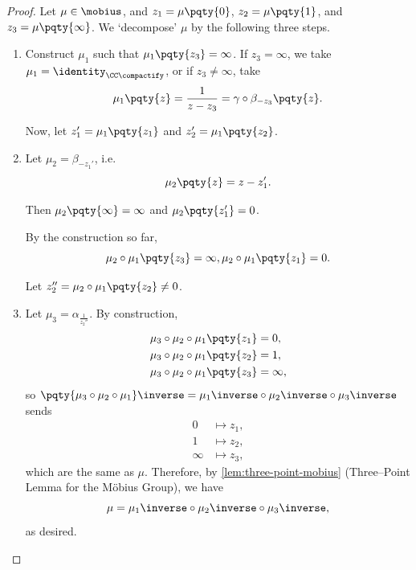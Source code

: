 \begin{proof}
    Let \(\mu \in \mobius\), and \(z_1 = \mu\pqty{0}\), \(z_2 = \mu\pqty{1}\), and \(z_3 = \mu\pqty{\infty}\). We `decompose' \(\mu\) by the following three steps.

    \begin{enumerate}
        \item Construct \(\mu_1\) such that \(\mu_1 \pqty{z_3} = \infty\). If \(z_3 = \infty\), we take \(\mu_1 = \identity_{\CC\compactify}\), or if \(z_3 \neq \infty\), take
        \[
            \mu_{1}\pqty{z} = \frac{1}{z - z_3} = \gamma \circ \beta_{- z_3} \pqty{z}.
        \]

        Now, let \(z_1' = \mu_1 \pqty{z_1}\) and \(z_2' = \mu_1 \pqty{z_2}\).

        \item Let \(\mu_2 = \beta_{- z_1'}\), i.e.
        \[
            \mu_2\pqty{z} = z - z_1'.
        \]

        Then \(\mu_2\pqty{\infty} = \infty\) and \(\mu_2\pqty{z_1'} = 0\).

        By the construction so far,
        \[
            \mu_2 \circ \mu_1 \pqty{z_3} = \infty, \mu_2 \circ \mu_1 \pqty{z_1} = 0.
        \]

        Let \(z_2'' = \mu_2 \circ \mu_1 \pqty{z_2} \neq 0\).

        \item Let \(\mu_3 = \alpha_{\frac{1}{z_2''}}\). By construction,
        \begin{align*}
            \mu_3 \circ \mu_2 \circ \mu_1 \pqty{z_1} &= 0, \\
            \mu_3 \circ \mu_2 \circ \mu_1 \pqty{z_2} &= 1, \\
            \mu_3 \circ \mu_2 \circ \mu_1 \pqty{z_3} &= \infty,
        \end{align*}
        so \(\pqty{\mu_3 \circ \mu_2 \circ \mu_1}\inverse = \mu_1\inverse \circ \mu_2\inverse \circ \mu_3\inverse\) sends
        \begin{align*}
            0 &\mapsto z_1, \\
            1 &\mapsto z_2, \\
            \infty &\mapsto z_3,
        \end{align*}
        which are the same as \(\mu\). Therefore, by \autoref{lem:three-point-mobius} (Three--Point Lemma for the M\"{o}bius Group), we have
        \[
            \mu = \mu_1\inverse \circ \mu_2\inverse \circ \mu_3\inverse,
        \]
        as desired.
    \end{enumerate}
\end{proof}


